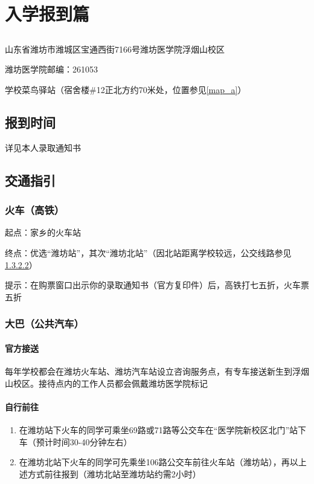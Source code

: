 \chapter[入学报到篇]{入学报到篇}
\section[报到地址（也是快递地址）]{}
山东省潍坊市潍城区宝通西街7166号潍坊医学院浮烟山校区

潍坊医学院邮编：261053

学校菜鸟驿站（宿舍楼\#12正北方约70米处，位置参见\uline{\ref{map_a}}）

\section[报到时间]{报到时间}
详见本人录取通知书

\section[交通指引]{交通指引}
\subsection[火车（高铁）]{火车（高铁）}
起点：家乡的火车站

终点：优选“潍坊站”，其次“潍坊北站”（因北站距离学校较远，公交线路参见\uline{\ref{bus}}）

提示：在购票窗口出示你的录取通知书（官方复印件）后，高铁打七五折，火车票五折

\subsection[大巴（公共汽车）]{大巴（公共汽车）}

\subsubsection[官方接送]{官方接送}
每年学校都会在潍坊火车站、潍坊汽车站设立咨询服务点，有专车接送新生到浮烟山校区。接待点内的工作人员都会佩戴潍坊医学院标记

\subsubsection[自行前往]{自行前往}
\label{bus}
\begin{enumerate}
    \item 在潍坊站下火车的同学可乘坐69路或71路等公交车在“医学院新校区北门”站下车（预计时间30-40分钟左右）
    \item 在潍坊北站下火车的同学可先乘坐106路公交车前往火车站（潍坊站），再以上述方式前往报到（潍坊北站至潍坊站约需2小时）
\end{enumerate}

